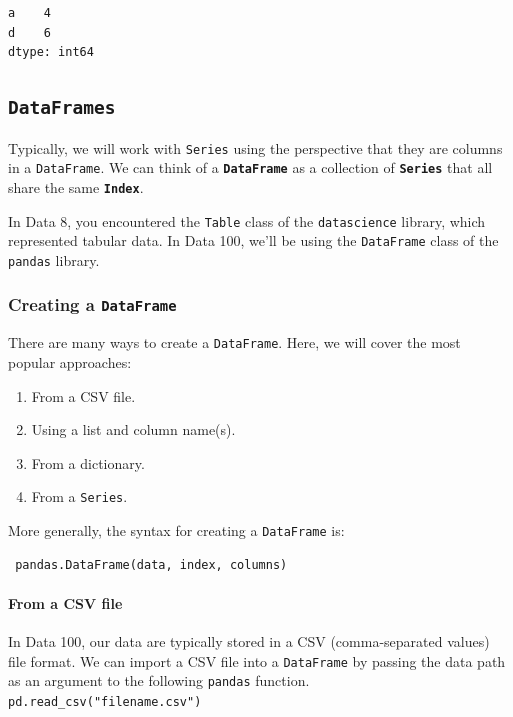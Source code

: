 \documentclass[
  letterpaper,
  DIV=11,
  numbers=noendperiod]{scrreprt}
\let\oldparagraph\paragraph
\renewcommand{\paragraph}[1]{\oldparagraph{#1}\mbox{}}
\providecommand{\tightlist}{%
  \setlength{\itemsep}{0pt}\setlength{\parskip}{0pt}}\usepackage{longtable,booktabs,array}
\begin{document}
\begin{verbatim}
a    4
d    6
dtype: int64
\end{verbatim}

\subsection{\texorpdfstring{\texttt{DataFrames}}{DataFrames}}\label{dataframes}

Typically, we will work with \texttt{Series} using the perspective that
they are columns in a \texttt{DataFrame}. We can think of a
\textbf{\texttt{DataFrame}} as a collection of \textbf{\texttt{Series}}
that all share the same \textbf{\texttt{Index}}.

In Data 8, you encountered the \texttt{Table} class of the
\texttt{datascience} library, which represented tabular data. In Data
100, we'll be using the \texttt{DataFrame} class of the \texttt{pandas}
library.

\subsubsection{\texorpdfstring{Creating a
\texttt{DataFrame}}{Creating a DataFrame}}\label{creating-a-dataframe}

There are many ways to create a \texttt{DataFrame}. Here, we will cover
the most popular approaches:

\begin{enumerate}
\def\labelenumi{\arabic{enumi}.}
\tightlist
\item
  From a CSV file.
\item
  Using a list and column name(s).
\item
  From a dictionary.
\item
  From a \texttt{Series}.
\end{enumerate}

More generally, the syntax for creating a \texttt{DataFrame} is:

\begin{verbatim}
 pandas.DataFrame(data, index, columns)
\end{verbatim}

\paragraph{From a CSV file}\label{from-a-csv-file}

In Data 100, our data are typically stored in a CSV (comma-separated
values) file format. We can import a CSV file into a \texttt{DataFrame}
by passing the data path as an argument to the following \texttt{pandas}
function.  \texttt{pd.read\_csv("filename.csv")}
\end{document}
